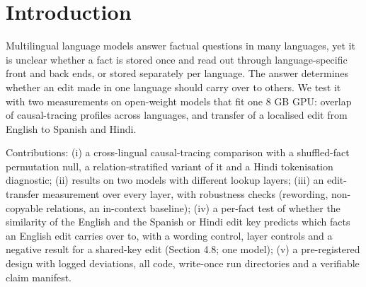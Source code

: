 \documentclass[11pt]{article}
\begin{document}
\begin{abstract}
fact\textquotesingle s traced layer, the cosine between the English and the Spanish (or Hindi) MLP input at the subject token is associated with held-out transfer (Spearman rho 0.41 {[}0.20, 0.59{]} for Spanish and 0.42 {[}0.19, 0.62{]} for Hindi, 80 facts; Holm p ≤ 0.0012); with the edit layer as a further control the partial rho is 0.26 and 0.22 (lower bounds 0.004 and 0.011), and at layer 14 there is no association (0.06, 0.02). Within five fixed layers the association is supported for Spanish (pooled rho 0.29 {[}0.12, 0.44{]}) and not for Hindi (0.17 {[}−0.02, 0.36{]}). Writing the edit at a key shared by the three languages does not close the gap (paired median gain at most 0.044 against a registered 0.15), and Spanish and Hindi transfer stay below transfer to unseen English wording (difference 0.26-0.39 and 0.73-0.79). The association is a correlation on one model; the intervention built on it did not help. Profile similarity is consistent with partly shared lookup for English and Spanish and cannot be separated from subject-name overlap in Llama; the interchange test supports shared retrieval of the fact at the subject token across all three languages in both models, on four geography-type relations and two small models, and does not by itself show a single language-agnostic space.
\end{abstract}
\section{Introduction}
Multilingual language models answer factual questions in many languages, yet it is unclear whether a fact is stored once and read out through language-specific front and back ends, or stored separately per language. The answer determines whether an edit made in one language should carry over to others. We test it with two measurements on open-weight models that fit one 8 GB GPU: overlap of causal-tracing profiles across languages, and transfer of a localised edit from English to Spanish and Hindi.

Contributions: (i) a cross-lingual causal-tracing comparison with a shuffled-fact permutation null, a relation-stratified variant of it and a Hindi tokenisation diagnostic; (ii) results on two models with different lookup layers; (iii) an edit-transfer measurement over every layer, with robustness checks (rewording, non-copyable relations, an in-context baseline); (iv) a per-fact test of whether the similarity of the English and the Spanish or Hindi edit key predicts which facts an English edit carries over to, with a wording control, layer controls and a negative result for a shared-key edit (Section 4.8; one model); (v) a pre-registered design with logged deviations, all code, write-once run directories and a verifiable claim manifest.
\end{document}
